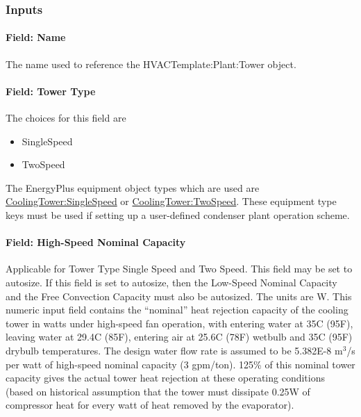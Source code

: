 \subsubsection{Inputs}\label{inputs-26-000}

\paragraph{Field: Name}\label{field-name-13-004}

The name used to reference the HVACTemplate:Plant:Tower object.

\paragraph{Field: Tower Type}\label{field-tower-type}

The choices for this field are

\begin{itemize}
\item
  SingleSpeed
\item
  TwoSpeed
\end{itemize}

The EnergyPlus equipment object types which are used are \hyperref[coolingtowersinglespeed]{CoolingTower:SingleSpeed} or \hyperref[coolingtowertwospeed]{CoolingTower:TwoSpeed}. These equipment type keys must be used if setting up a user-defined condenser plant operation scheme.

\paragraph{Field: High-Speed Nominal Capacity}\label{field-high-speed-nominal-capacity-000}

Applicable for Tower Type Single Speed and Two Speed. This field may be set to autosize. If this field is set to autosize, then the Low-Speed Nominal Capacity and the Free Convection Capacity must also be autosized. The units are W. This numeric input field contains the ``nominal'' heat rejection capacity of the cooling tower in watts under high-speed fan operation, with entering water at 35C (95F), leaving water at 29.4C (85F), entering air at 25.6C (78F) wetbulb and 35C (95F) drybulb temperatures. The design water flow rate is assumed to be 5.382E-8 m\(^{3}\)/s per watt of high-speed nominal capacity (3 gpm/ton). 125\% of this nominal tower capacity gives the actual tower heat rejection at these operating conditions (based on historical assumption that the tower must dissipate 0.25W of compressor heat for every watt of heat removed by the evaporator).

